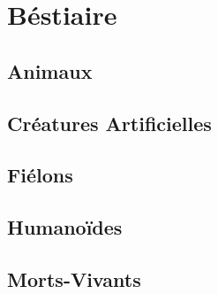 \documentclass{dd}
\begin{document}
\chapter{Béstiaire}

\section{Animaux}



\section{Créatures Artificielles}









\section{Fiélons}










\section{Humanoïdes}











\section{Morts-Vivants}








\end{document}
